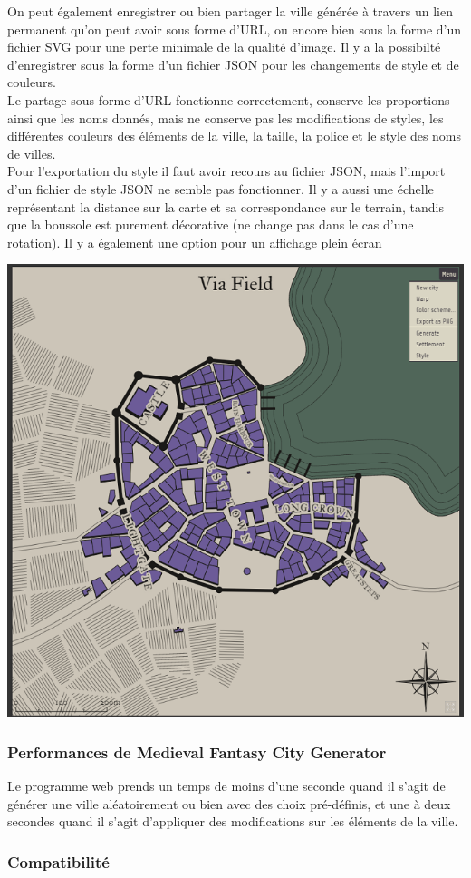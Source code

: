 On peut également enregistrer ou bien partager la ville générée à travers un lien permanent qu'on peut avoir sous forme d'URL, ou encore bien sous la forme d'un fichier SVG pour une perte minimale de la qualité d'image. Il y a la possibilté d'enregistrer sous la forme d'un fichier JSON pour les changements de style et de couleurs.\\

Le partage sous forme d'URL fonctionne correctement, conserve les proportions ainsi que les noms donnés, mais ne conserve pas les modifications de styles, les différentes couleurs des éléments de la ville, la taille, la police et le style des noms de villes.\\

Pour l'exportation du style il faut avoir recours au fichier JSON, mais l'import d'un fichier de style JSON ne semble pas fonctionner.
Il y a aussi une échelle représentant la distance sur la carte et sa correspondance sur le terrain, tandis que la boussole est purement  décorative (ne change pas dans le cas d'une rotation).
Il y a également une option pour un affichage plein écran \cite{medieval}
\begin{center}
\includegraphics[height = 5 cm]{images/figure8.png}\\
\end{center}

\subsubsection{Performances de Medieval Fantasy City Generator}

Le programme web prends un temps de moins d'une seconde quand il s'agit de générer une ville aléatoirement ou bien avec des choix pré-définis, et une à deux secondes quand il s'agit d'appliquer des modifications sur les éléments de la ville.

\subsubsection{Compatibilité}

